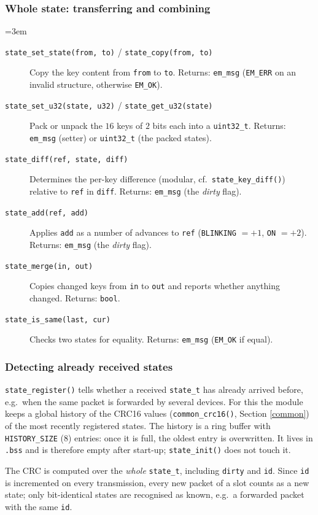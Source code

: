 \subsubsection*{Whole state: transferring and combining}
{\sloppy\emergencystretch=3em
\begin{description}
\item[\texttt{state\_set\_state(from, to)} / \texttt{state\_copy(from, to)}]
  Copy the key content from \verb|from| to \verb|to|. Returns: \verb|em_msg|
  (\verb|EM_ERR| on an invalid structure, otherwise \verb|EM_OK|).
\item[\texttt{state\_set\_u32(state, u32)} / \texttt{state\_get\_u32(state)}]
  Pack or unpack the $16$ keys of $2$ bits each into a \verb|uint32_t|.
  Returns: \verb|em_msg| (setter) or \verb|uint32_t| (the packed states).
\item[\texttt{state\_diff(ref, state, diff)}] Determines the per-key difference
  (modular, cf.\ \verb|state_key_diff()|) relative to \verb|ref| in
  \verb|diff|. Returns: \verb|em_msg| (the \emph{dirty} flag).
\item[\texttt{state\_add(ref, add)}] Applies \verb|add| as a number of
  advances to \verb|ref| (\verb|BLINKING| $= +1$, \verb|ON| $= +2$). Returns:
  \verb|em_msg| (the \emph{dirty} flag).
\item[\texttt{state\_merge(in, out)}] Copies changed keys from \verb|in| to
  \verb|out| and reports whether anything changed. Returns: \verb|bool|.
\item[\texttt{state\_is\_same(last, cur)}] Checks two states for equality.
  Returns: \verb|em_msg| (\verb|EM_OK| if equal).
\end{description}
\par}

\subsubsection*{Detecting already received states}
\verb|state_register()| tells whether a received \verb|state_t| has already
arrived before, e.g.\ when the same packet is forwarded by several devices.
For this the module keeps a global history of the CRC16 values
(\verb|common_crc16()|, Section \ref{common}) of the most recently registered
states. The history is a ring buffer with \verb|HISTORY_SIZE| ($8$) entries:
once it is full, the oldest entry is overwritten. It lives in \verb|.bss| and
is therefore empty after start-up; \verb|state_init()| does not touch it.

The CRC is computed over the \emph{whole} \verb|state_t|, including
\verb|dirty| and \verb|id|. Since \verb|id| is incremented on every
transmission, every new packet of a slot counts as a new state; only
bit-identical states are recognised as known, e.g.\ a forwarded packet with
the same \verb|id|.

